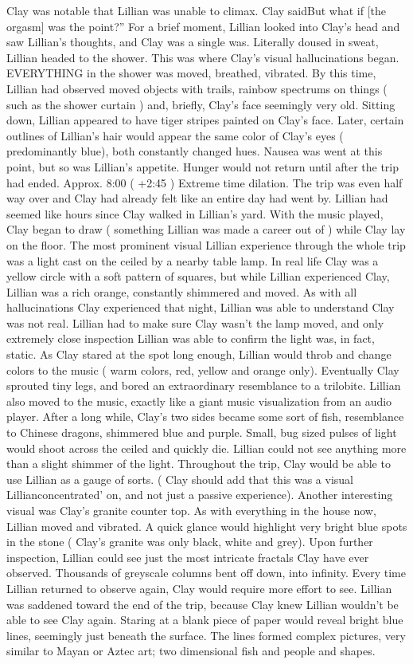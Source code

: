 \documentclass[12pt]{book}
\begin{document}
Clay was notable that Lillian was unable to climax. Clay saidBut what if [the orgasm] was the point?'' For a brief moment, Lillian looked into Clay's head and saw Lillian's thoughts, and Clay was a single was. Literally doused in sweat, Lillian headed to the shower. This was where Clay's visual hallucinations began. EVERYTHING in the shower was moved, breathed, vibrated. By this time, Lillian had observed moved objects with trails, rainbow spectrums on things ( such as the shower curtain ) and, briefly, Clay's face seemingly very old. Sitting down, Lillian appeared to have tiger stripes painted on Clay's face. Later, certain outlines of Lillian's hair would appear the same color of Clay's eyes ( predominantly blue), both constantly changed hues. Nausea was went at this point, but so was Lillian's appetite. Hunger would not return until after the trip had ended. Approx. 8:00 ( +2:45 ) Extreme time dilation. The trip was even half way over and Clay had already felt like an entire day had went by. Lillian had seemed like hours since Clay walked in Lillian's yard. With the music played, Clay began to draw ( something Lillian was made a career out of ) while Clay lay on the floor. The most prominent visual Lillian experience through the whole trip was a light cast on the ceiled by a nearby table lamp. In real life Clay was a yellow circle with a soft pattern of squares, but while Lillian experienced Clay, Lillian was a rich orange, constantly shimmered and moved. As with all hallucinations Clay experienced that night, Lillian was able to understand Clay was not real. Lillian had to make sure Clay wasn't the lamp moved, and only extremely close inspection Lillian was able to confirm the light was, in fact, static. As Clay stared at the spot long enough, Lillian would throb and change colors to the music ( warm colors, red, yellow and orange only). Eventually Clay sprouted tiny legs, and bored an extraordinary resemblance to a trilobite. Lillian also moved to the music, exactly like a giant music visualization from an audio player. After a long while, Clay's two sides became some sort of fish,  resemblance to Chinese dragons, shimmered blue and purple. Small, bug sized pulses of light would shoot across the ceiled and quickly die. Lillian could not see anything more than a slight shimmer of the light. Throughout the trip, Clay would be able to use Lillian as a gauge of sorts. ( Clay should add that this was a visual Lillianconcentrated' on, and not just a passive experience). Another interesting visual was Clay's granite counter top. As with everything in the house now, Lillian moved and vibrated. A quick glance would highlight very bright blue spots in the stone ( Clay's granite was only black, white and grey). Upon further inspection, Lillian could see just the most intricate fractals Clay have ever observed. Thousands of greyscale columns bent off down, into infinity. Every time Lillian returned to observe again, Clay would require more effort to see. Lillian was saddened toward the end of the trip, because Clay knew Lillian wouldn't be able to see Clay again. Staring at a blank piece of paper would reveal bright blue lines, seemingly just beneath the surface. The lines formed complex pictures, very similar to Mayan or Aztec art; two dimensional fish and people and shapes. 
\end{document}
